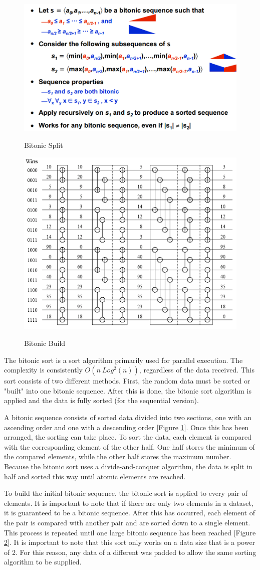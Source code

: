\documentclass[journal]{IEEEtran}
\begin{document}
	\begin{figure}[t!]
	\caption{Bitonic Split}
  \centering
	\includegraphics[width=.5\textwidth]{bitonic_split.png}
	\label{bitonic_split}
	\end{figure}
	
	\begin{figure}[t!]
	\caption{Bitonic Build}
  \centering
	\includegraphics[width=.5\textwidth]{bitonic_build_2.png}
	\label{bitonic_build}
	\end{figure}

The bitonic sort is a sort algorithm primarily used for parallel execution. The complexity is consistently  $O(n\ Log^2(n))$, regardless of the data received. This sort consists of two different methods.  First, the random data must be sorted or "built" into one bitonic sequence.  After this is done, the bitonic sort algorithm is applied and the data is fully sorted (for the sequential version).  

A bitonic sequence consists of sorted data divided into two sections, one with an ascending order and one with a descending order [Figure \ref{bitonic_split}].   Once this has been arranged, the sorting can take place.  To sort the data, each element is compared with the corresponding element of the other half. One half stores the minimum of the compared elements, while the other half stores the maximum number.  Because the bitonic sort uses a divide-and-conquer algorithm, the data is split in half and sorted this way until atomic elements are reached.  

To build the initial bitonic sequence, the bitonic sort is applied to every pair of elements.  It is important to note that if there are only two elements in a dataset, it is guaranteed to be a bitonic sequence.  After this has occurred, each element of the pair is compared with another pair and are sorted down to a single element.  This process is repeated until one large bitonic sequence has been reached [Figure \ref{bitonic_build}].  It is important to note that this sort only works on a data size that is a power of 2.  For this reason, any data of a different was padded to allow the same sorting algorithm to be supplied.
\end{document}
